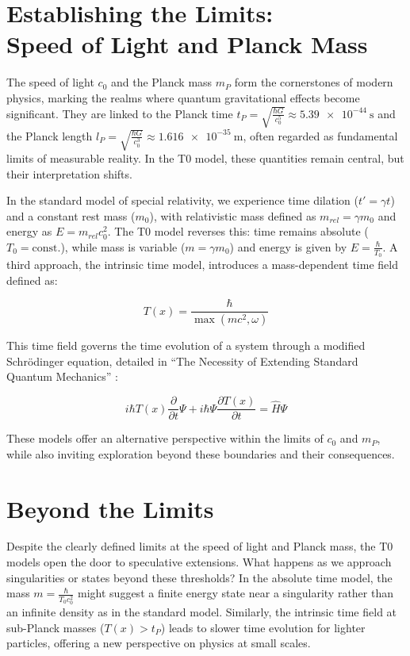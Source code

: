 \documentclass[a4paper,12pt]{article}
\newcommand{\Tfield}{T(x)}
\begin{document}
	\section{Establishing the Limits: \\Speed of Light and Planck Mass}
	
	The speed of light \(c_0\) and the Planck mass \(m_P\) form the cornerstones of modern physics, marking the realms where quantum gravitational effects become significant. They are linked to the Planck time \(t_P = \sqrt{\frac{\hbar G}{c_0^5}} \approx \SI{5.39e-44}{\second}\) and the Planck length \(l_P = \sqrt{\frac{\hbar G}{c_0^3}} \approx \SI{1.616e-35}{\meter}\), often regarded as fundamental limits of measurable reality. In the T0 model, these quantities remain central, but their interpretation shifts.
	
	In the standard model of special relativity, we experience time dilation (\(t' = \gamma t\)) and a constant rest mass (\(m_0\)), with relativistic mass defined as \(m_{rel} = \gamma m_0\) and energy as \(E = m_{rel} c_0^2\). The T0 model reverses this: time remains absolute (\(T_0 = \text{const.}\)), while mass is variable (\(m = \gamma m_0\)) and energy is given by \(E = \frac{\hbar}{T_0}\). A third approach, the intrinsic time model, introduces a mass-dependent time field defined as:
	
	\begin{equation}
		\Tfield = \frac{\hbar}{\max(m c^2, \omega)}
	\end{equation}
	
	This time field governs the time evolution of a system through a modified Schrödinger equation, detailed in “The Necessity of Extending Standard Quantum Mechanics” \cite{pascher_quantum_2025}:
	
	\begin{equation}
		i\hbar \Tfield \frac{\partial}{\partial t} \Psi + i\hbar \Psi \frac{\partial \Tfield}{\partial t} = \hat{H} \Psi
	\end{equation}
	
	These models offer an alternative perspective within the limits of \(c_0\) and \(m_P\), while also inviting exploration beyond these boundaries and their consequences.
	
	\section{Beyond the Limits}
	
	Despite the clearly defined limits at the speed of light and Planck mass, the T0 models open the door to speculative extensions. What happens as we approach singularities or states beyond these thresholds? In the absolute time model, the mass \(m = \frac{\hbar}{T_0 c_0^2}\) might suggest a finite energy state near a singularity rather than an infinite density as in the standard model. Similarly, the intrinsic time field at sub-Planck masses (\(\Tfield > t_P\)) leads to slower time evolution for lighter particles, offering a new perspective on physics at small scales.
	
\end{document}
